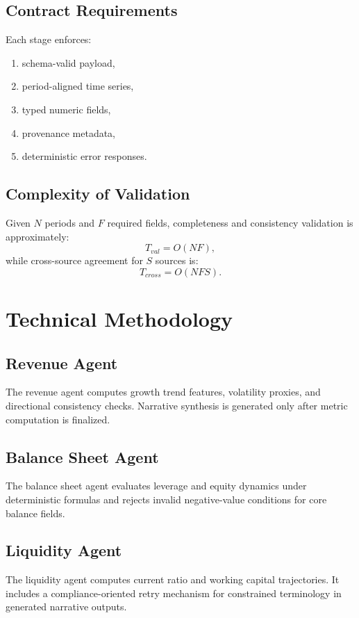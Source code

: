\documentclass[conference]{IEEEtran}
\begin{document}
\subsection{Contract Requirements}
Each stage enforces:
\begin{enumerate}
    \item schema-valid payload,
    \item period-aligned time series,
    \item typed numeric fields,
    \item provenance metadata,
    \item deterministic error responses.
\end{enumerate}

\subsection{Complexity of Validation}
Given $N$ periods and $F$ required fields, completeness and consistency validation is approximately:
\begin{equation}
T_{val}=O(NF),
\end{equation}
while cross-source agreement for $S$ sources is:
\begin{equation}
T_{cross}=O(NFS).
\end{equation}

\section{Technical Methodology}
\subsection{Revenue Agent}
The revenue agent computes growth trend features, volatility proxies, and directional consistency checks. Narrative synthesis is generated only after metric computation is finalized.

\subsection{Balance Sheet Agent}
The balance sheet agent evaluates leverage and equity dynamics under deterministic formulas and rejects invalid negative-value conditions for core balance fields.

\subsection{Liquidity Agent}
The liquidity agent computes current ratio and working capital trajectories. It includes a compliance-oriented retry mechanism for constrained terminology in generated narrative outputs.
\end{document}
